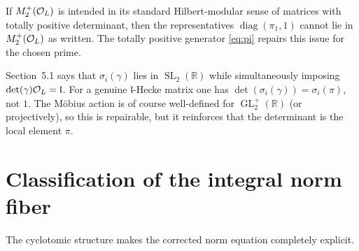 \begin{remark}
If $M_2^+(\mathcal O_L)$ is intended in its standard Hilbert-modular sense of matrices with totally positive determinant, then the representatives $\operatorname{diag}(\pi_1,1)$ cannot lie in $M_2^+(\mathcal O_L)$ as written. The totally positive generator \eqref{eq:pi} repairs this issue for the chosen prime.
\end{remark}

\begin{remark}
Section~5.1 says that $\sigma_i(\gamma)$ lies in $\operatorname{SL}_2(\mathbb R)$ while simultaneously imposing $\det(\gamma)\mathcal O_L=\mathfrak l$.  For a genuine $\mathfrak l$-Hecke matrix one has $\det(\sigma_i(\gamma))=\sigma_i(\pi)$, not $1$.  The M\"obius action is of course well-defined for $\operatorname{GL}_2^+(\mathbb R)$ (or projectively), so this is repairable, but it reinforces that the determinant is the local element $\pi$.
\end{remark}


\section{Classification of the integral norm fiber}
The cyclotomic structure makes the corrected norm equation completely explicit.

